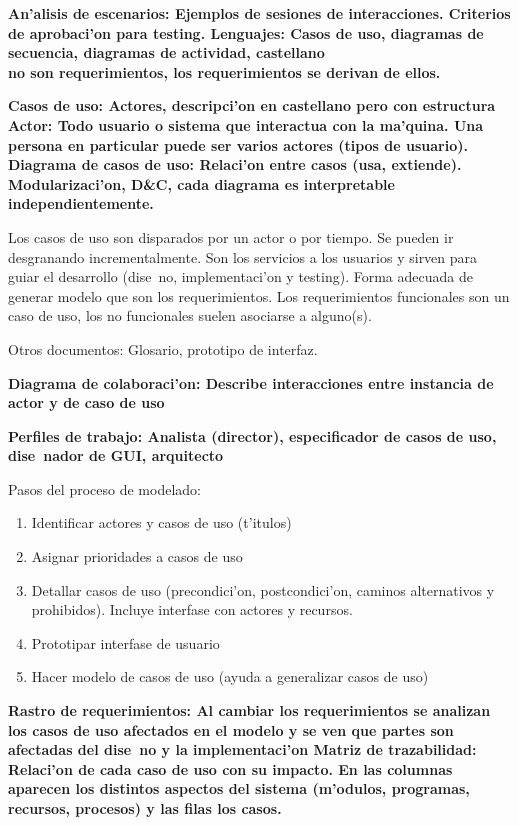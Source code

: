 \documentclass[a4paper,spanish]{article}
\newcommand{\tab}{\hspace*{1cm}}
\newcommand{\defi}[2]{\bfseries #1: \mdseries #2}
\newcommand{\sdefi}[2]{\newline \tab \bfseries #1: \mdseries #2}
\begin{document}
\defi{An'alisis de escenarios}{Ejemplos de sesiones de interacciones. Criterios de aprobaci'on para testing.}
\sdefi{Lenguajes}{Casos de uso, diagramas de secuencia, diagramas de actividad, castellano} \\
\tab \textbf{no} son requerimientos, los requerimientos se derivan de ellos.

\defi{Casos de uso}{Actores, descripci'on en castellano pero con estructura}
\sdefi{Actor}{Todo usuario o sistema que interactua con la ma'quina. Una persona en particular puede ser
varios actores (tipos de usuario).} \\
\defi{Diagrama de casos de uso}{Relaci'on entre casos (usa, extiende). Modularizaci'on, D\&C, cada diagrama
es interpretable independientemente.}

Los casos de uso son disparados por un actor o por tiempo. Se pueden ir desgranando incrementalmente.
Son los servicios a los usuarios y sirven para guiar el desarrollo (dise~no, implementaci'on y testing).
Forma adecuada de generar modelo que son los requerimientos. Los requerimientos funcionales son un caso
de uso, los no funcionales suelen asociarse a alguno(s).

Otros documentos: Glosario, prototipo de interfaz.

\defi{Diagrama de colaboraci'on}{Describe interacciones entre instancia de actor y de caso de uso}

\defi{Perfiles de trabajo}{Analista (director), especificador de casos de uso, dise~nador de GUI, 
arquitecto}

Pasos del proceso de modelado:
\begin{enumerate}
\item Identificar actores y casos de uso (t'itulos)
\item Asignar prioridades a casos de uso
\item Detallar casos de uso (precondici'on, postcondici'on, caminos alternativos y prohibidos). Incluye interfase
con actores y recursos.
\item Prototipar interfase de usuario
\item Hacer modelo de casos de uso (ayuda a generalizar casos de uso)
\end{enumerate}

\defi{Rastro de requerimientos}{Al cambiar los requerimientos se analizan los casos de uso afectados en el modelo 
y se ven que partes son afectadas del dise~no y la implementaci'on}
\sdefi{Matriz de trazabilidad}{Relaci'on de cada caso de uso con su impacto. En las columnas aparecen los distintos
aspectos del sistema (m'odulos, programas, recursos, procesos) y las filas los casos.}
\end{document}
